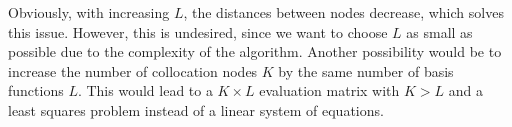 \documentclass[a4paper,11pt,bibliography=totoc,listof=totoc,headinclude=true,cleardoublepage=empty,oneside]{scrbook}
\begin{document}
Obviously, with increasing $L$, the distances between nodes decrease, which solves this issue. However, this is undesired, since we want to choose $L$ as small as possible due to the complexity of the algorithm. Another possibility would be to increase the number of collocation nodes $K$ by the same number of basis functions $L$. This would lead to a $K\times L$ evaluation matrix with $K>L$ and a least squares problem instead of a linear system of equations.


\begin{figure}[h]
    
    \centering
\end{figure}
\end{document}
